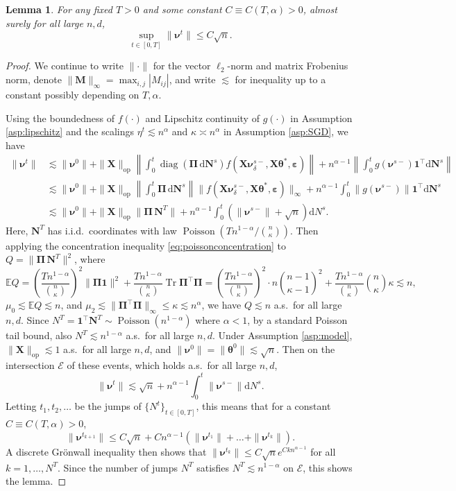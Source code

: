 \documentclass[11pt,letterpaper,reqno]{amsart}
\newtheorem{lem}[thm]{Lemma}
\theoremstyle{definition}
\def\d{\mathrm{d}}
\def\E{\mathbb{E}}
\def\Tr{\operatorname{Tr}}
\def\Pois{\operatorname{Poisson}}
\def\op{\mathrm{op}}
\def\diag{\operatorname{diag}}
\def\M{\mathbf{M}}
\def\bN{\mathbf{N}}
\def\X{\mathbf{X}}
\def\1{\mathbf{1}}
\def\beps{\boldsymbol{\varepsilon}}
\def\btheta{\boldsymbol{\theta}}
\def\bnu{\boldsymbol{\nu}}
\def\bPi{\boldsymbol{\Pi}}
\newcommand{\norm}[1]{\|#1\|}
\begin{document}
\begin{lem}\label{lem:l2-bound-sgd}
For any fixed $T>0$ and some constant $C \equiv C(T,\alpha)>0$,
almost surely for all large $n,d$,
\[\sup_{t\in [0,T]}\norm{\bnu^t} \leq C\sqrt{n}.\]
\end{lem}
\begin{proof}
We continue to write $\|\cdot\|$ for the vector $\ell_2$-norm and matrix
Frobenius norm, denote $\|\M\|_\infty=\max_{i,j} |M_{ij}|$, and write $\lesssim$
for inequality up to a constant possibly depending on $T,\alpha$.

Using the boundedness of $f(\cdot)$ and Lipschitz continuity of $g(\cdot)$ in
Assumption \ref{asp:lipschitz} and the scalings $\eta^t \lesssim n^\alpha$
and $\kappa \asymp n^\alpha$ in Assumption \ref{asp:SGD}, we have
\begin{align*}
\|\bnu^t\| &\lesssim \|\bnu^0\|+\|\X\|_\op\left\|\int_0^t \diag(\bPi\,\d\bN^s)
f(\X\bnu_\delta^{s-},\X\btheta^*,\beps)\right\|
+n^{\alpha-1}\left\|\int_0^t g(\bnu^{s-})\1^\top \d\bN^s\right\|\\
&\lesssim \|\bnu^0\|+\|\X\|_\op\left\|\int_0^t \bPi\,\d\bN^s\right\|
\|f(\X\bnu_\delta^{s-},\X\btheta^*,\beps)\|_\infty
+n^{\alpha-1}\int_0^t \|g(\bnu^{s-})\|\1^\top \d\bN^s\\
&\lesssim \|\bnu^0\|+\|\X\|_\op\|\bPi\,\bN^T\|
+n^{\alpha-1}\int_0^t (\|\bnu^{s-}\|+\sqrt{n}) \d N^s.
\end{align*}
Here, $\bN^T$ has i.i.d.\ coordinates with law
$\Pois(Tn^{1-\alpha}/\binom{n}{\kappa})$. Then
applying the concentration inequality \eqref{eq:poissonconcentration} to
$Q=\|\bPi\,\bN^T\|^2$, where
\[\E Q=\left(\frac{Tn^{1-\alpha}}{\binom{n}{\kappa}}\right)^2
\|\bPi \1\|^2
+\frac{Tn^{1-\alpha}}{\binom{n}{\kappa}}
\Tr \bPi^\top \bPi
=\left(\frac{Tn^{1-\alpha}}{\binom{n}{\kappa}}\right)^2
\cdot n\binom{n-1}{\kappa-1}^2
+\frac{Tn^{1-\alpha}}{\binom{n}{\kappa}} \binom{n}{\kappa}\kappa
\lesssim n,\]
$\mu_0 \lesssim \E Q \lesssim n$, and $\mu_2 \lesssim \|\bPi^\top \bPi\|_\infty
\leq \kappa \lesssim n^\alpha$, we have $Q \lesssim n$ a.s.\ for all large
$n,d$. Since $N^T=\1^\top \bN^T \sim \Pois(n^{1-\alpha})$ where
$\alpha<1$, by a standard Poisson tail bound, also
$N^T \lesssim n^{1-\alpha}$ a.s.\ for all large $n,d$.
Under Assumption \ref{asp:model}, 
$\|\X\|_\op \lesssim 1$ a.s.\ for all large $n,d$, and
$\|\bnu^0\|=\|\btheta^0\| \lesssim \sqrt{n}$. Then on the
intersection $\mathcal{E}$ of these events, which holds a.s.\ for all large $n,d$,
\[\|\bnu^t\| \lesssim \sqrt{n}+n^{\alpha-1}\int_0^t \|\bnu^{s-}\| \d N^s.\]
Letting $t_1,t_2,\ldots$ be the jumps of $\{N^t\}_{t \in [0,T]}$, this means
that for a constant $C \equiv C(T,\alpha)>0$,
\[\|\bnu^{t_{k+1}}\| \leq
C\sqrt{n}+Cn^{\alpha-1}(\|\bnu^{t_1}\|+\ldots+\|\bnu^{t_k}\|).\]
A discrete Gr\"onwall inequality then shows that
$\|\bnu^{t_k}\| \leq C\sqrt{n} e^{Ckn^{\alpha-1}}$ for all $k=1,\ldots,N^T$.
Since the number of jumps $N^T$
satisfies $N^T \lesssim n^{1-\alpha}$ on $\mathcal{E}$, this shows the lemma.
\end{proof}
\end{document}
